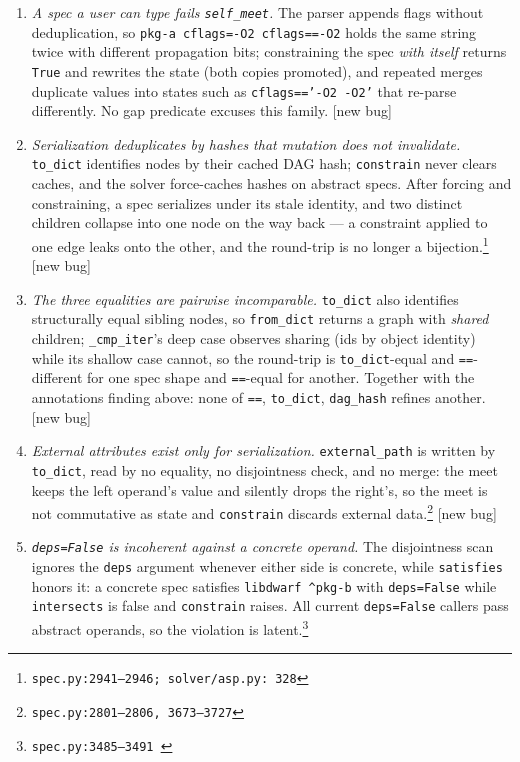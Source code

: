 \documentclass[11pt]{article}
\theoremstyle{definition}
\theoremstyle{remark}
\newcommand{\code}[1]{\texttt{#1}}
\newcommand{\src}[1]{\footnote{\code{#1}}}
\begin{document}
\begin{enumerate}[itemsep=3pt]
\item \emph{A spec a user can type fails \code{self\_meet}.}  The parser
appends flags without deduplication, so \code{pkg-a cflags=-O2 cflags==-O2}
holds the same string twice with different propagation bits; constraining
the spec \emph{with itself} returns \code{True} and rewrites the state
(both copies promoted), and repeated merges duplicate values into states
such as \code{cflags=='-O2 -O2'} that re-parse differently.  No gap
predicate excuses this family.  [new bug]
\item \emph{Serialization deduplicates by hashes that mutation does not
invalidate.}  \code{to\_dict} identifies nodes by their cached DAG hash;
\code{constrain} never clears caches, and the solver force-caches hashes on
abstract specs.  After forcing and constraining, a spec serializes under its
stale identity, and two distinct children collapse into one node on the way
back --- a constraint applied to one edge leaks onto the other, and the
round-trip is no longer a bijection.\src{spec.py:2941--2946; solver/asp.py:%
328}  [new bug]
\item \emph{The three equalities are pairwise incomparable.}
\code{to\_dict} also identifies structurally equal sibling nodes, so
\code{from\_dict} returns a graph with \emph{shared} children;
\code{\_cmp\_iter}'s deep case observes sharing (ids by object identity)
while its shallow case cannot, so the round-trip is \code{to\_dict}-equal
and \code{==}-different for one spec shape and \code{==}-equal for another.
Together with the annotations finding above: none of \code{==},
\code{to\_dict}, \code{dag\_hash} refines another.  [new bug]
\item \emph{External attributes exist only for serialization.}
\code{external\_path} is written by \code{to\_dict}, read by no equality, no
disjointness check, and no merge: the meet keeps the left operand's value
and silently drops the right's, so the meet is not commutative as state and
\code{constrain} discards external data.\src{spec.py:2801--2806,
3673--3727}  [new bug]
\item \emph{\code{deps=False} is incoherent against a concrete operand.}
The disjointness scan ignores the \code{deps} argument whenever either side
is concrete, while \code{satisfies} honors it: a concrete spec satisfies
\code{libdwarf \^{}pkg-b} with \code{deps=False} while \code{intersects} is
false and \code{constrain} raises.  All current \code{deps=False} callers
pass abstract operands, so the violation is latent.\src{spec.py:3485--3491
}
\end{enumerate}
\end{document}
